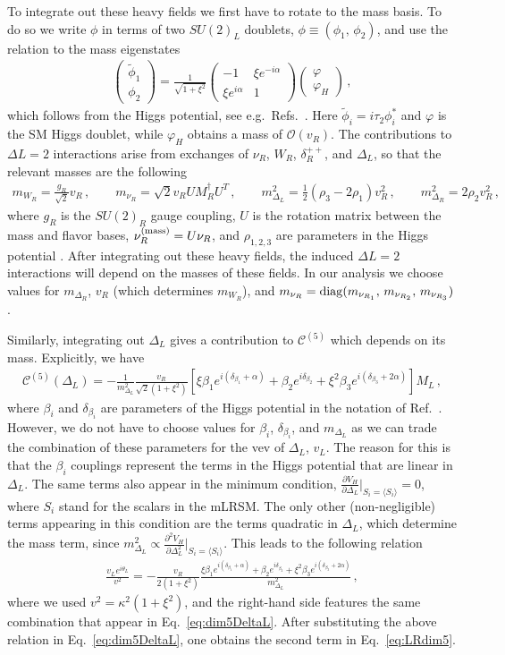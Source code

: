 \documentclass[letterpaper,11pt]{article}
\newcommand{\al}{\alpha}
\newcommand{\bt}{\beta}
\newcommand{\dt}{\delta}
\newcommand{\ka}{\kappa}
\newcommand{\Dt}{\Delta}
\newcommand{\bea}{\begin{eqnarray}}
\newcommand{\eea}{\end{eqnarray}}
\newcommand{\bma}{\begin{pmatrix}}
\newcommand{\ema}{\end{pmatrix}}
\newcommand{\Or}{\mathcal O}
\newcommand{\vp}{\varphi}
\newcommand{\sq}{^{2}}
\begin{document}
To integrate out these heavy fields we first have to rotate to the mass basis. To do so we   write $\phi$ in terms of two $SU(2)_L$ doublets, $\phi\equiv (\phi_1,\, \phi_2)$, and use the  relation to the mass eigenstates
\bea\label{HiggsRot}
\bma \tilde \phi_1\\\phi_2 \ema = \frac{1}{\sqrt{1+\xi\sq}}\bma -1 & \xi e^{-i\al}\\\xi e^{i\al} & 1\ema \bma \vp\\ \vp_H\ema \,,
\eea
which follows from the Higgs potential, see e.g.\ Refs.\ \cite{Duka:1999uc,Kiers:2005gh,Zhang:2007da,Dekens:2014ina}.
Here $\tilde \phi_i= i\tau_2 \phi_i^*$ and $\vp$ is the SM Higgs doublet, while $\vp_H$ obtains a mass of $\Or(v_R)$. 
The contributions to $\Dt L=2$  interactions arise from exchanges of $\nu_R$, $W_R$, $\dt^{++}_R$, and $\Dt_L$, so that the relevant masses are the following
\bea
m_{W_R}=\frac{g_R}{\sqrt{2}}v_R\,,\qquad m_{\nu_R} = \sqrt{2}v_R U M_R^\dagger U^T\,,
\qquad m_{\Dt_L}\sq = \frac{1}{2}(\rho_3-2\rho_1)v_R\sq\,,\qquad m_{\Dt_R}\sq = 2\rho_2 v_R\sq\,,
\eea
where $g_R$ is the $SU(2)_R$ gauge coupling, $U$ is the rotation matrix between the mass and flavor bases, $\nu_R^{\rm (mass)} = U\nu_R$, and 
 $\rho_{1,2,3}$ are parameters in the Higgs potential \cite{Zhang:2007da}. 
After integrating out these heavy fields, the induced $\Dt L=2$ interactions will depend on the masses of these fields. In our analysis we  choose values for $m_{\Dt_R}$, $v_R$ (which determines $m_{W_R}$), and $m_{\nu_R}={\rm diag}(m_{\nu_{R_1}},\,m_{\nu_{R_2}},\,m_{\nu_{R_3}})$.  
 
 Similarly,  integrating out $\Dt_L$ gives a contribution to $ \mathcal C^{(5)}$ which depends on  its mass. Explicitly, we have
 \bea\label{eq:dim5DeltaL}
 \mathcal C^{(5)}(\Dt_L) = -\frac{1}{m_{\Dt_L}\sq}\frac{v_R}{\sqrt{2}(1+\xi\sq)}\left[\xi \bt_1 e^{i(\dt_{\bt_1}+\al)}+\bt_2 e^{i\dt_{\bt_2}}+\xi\sq\bt_3 e^{i(\dt_{\bt_3}+2\al)}\right]M_L\,,
 \eea
 where $\bt_{i}$ and $\dt_{\bt_i}$ are parameters of the Higgs potential in the notation of Ref.\ \cite{Dekens:2014ina}.
However, we do not have to choose values for $\bt_i$, $\dt_{\bt_i}$, and $m_{\Dt_L}$ as we can trade the combination of these parameters for the vev of $\Dt_L$, $v_L$. The reason for this is that the  $\bt_i$ couplings represent the terms in the Higgs potential that are linear in $\Dt_L$. The same terms also appear in the minimum condition, $\frac{\partial V_H}{\partial \Delta_L}\big|_{S_i=\langle S_i\rangle} = 0$, where $S_i$ stand for  the scalars in the mLRSM. The only other (non-negligible) terms appearing in this condition are the terms quadratic in $\Dt_L$, which  determine the mass term, since $m_{\Dt_L}\sq\propto \frac{\partial\sq V_H}{\partial \Dt_L\sq}\big|_{S_i=\langle S_i\rangle}$. This leads to the following relation 
\bea
\frac{v_Le^{i\theta_L}}{v^2}=-\frac{v_R}{2(1+\xi\sq)}\frac{\xi \bt_1 e^{i(\dt_{\bt_1}+\al)}+\bt_2 e^{i\dt_{\bt_2}}+\xi\sq\bt_3 e^{i(\dt_{\bt_3}+2\al)}}{m_{\Dt_L}\sq}\,,
\eea
where we used $v^2 = \ka\sq(1+\xi\sq)$, and the right-hand side features the same combination that appear in Eq.\ \eqref{eq:dim5DeltaL}. After substituting the above relation in Eq.\ \eqref{eq:dim5DeltaL}, one  obtains the second term in Eq.\ \eqref{eq:LRdim5}.
\end{document}
